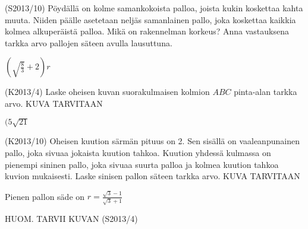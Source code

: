 \begin{tehtava} 
(S2013/10) Pöydällä on kolme samankokoista palloa, joista kukin koskettaa kahta muuta. Niiden päälle asetetaan neljäs samanlainen pallo, joka koskettaa kaikkia kolmea alkuperäistä palloa. Mikä on rakennelman korkeus? Anna vastauksena tarkka arvo pallojen säteen avulla lausuttuna.
  \begin{vastaus}
  $\left(\sqrt{\frac83}+2\right)r$
  \end{vastaus}
\end{tehtava}

\begin{tehtava} 
(K2013/4) Laske oheisen kuvan suorakulmaisen kolmion $ABC$ pinta-alan tarkka arvo.
KUVA TARVITAAN
  \begin{vastaus}
  $(5\sqrt{21}$
  \end{vastaus}
\end{tehtava}

\begin{tehtava} 
(K2013/10) Oheisen kuution särmän pituus on 2. Sen sisällä on vaaleanpunainen pallo, joka sivuaa jokaista kuution tahkoa. Kuution yhdessä kulmassa on pienempi sininen pallo, joka sivuaa suurta palloa ja kolmea kuution tahkoa kuvion mukaisesti. Laske sinisen pallon säteen tarkka arvo.
KUVA TARVITAAN
  \begin{vastaus}
  Pienen pallon säde on $r=\frac{\sqrt{3}-1}{\sqrt{3}+1}$
  \end{vastaus}
\end{tehtava}

\begin{tehtava} 
HUOM. TARVII KUVAN 
(S2013/4) 
  \begin{alakohdat}

  \end{alakohdat}
				\begin{vastaus}
				\begin{alakohdat}
				\end{alakohdat}
				\end{vastaus}
\end{tehtava}

